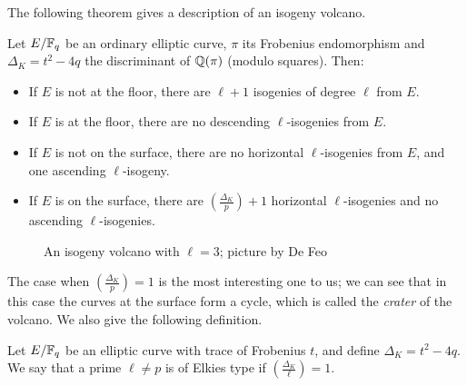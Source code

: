 The following theorem gives a description of an isogeny volcano.
\begin{theorem}
    Let $E/\mathbb{F}_q$ be an ordinary elliptic curve, $\pi$ its Frobenius endomorphism and $\Delta_K=t^2-4q$ the discriminant of $\mathbb{Q}(\pi)$ (modulo squares). Then:
    \begin{itemize}
        \item If $E$ is not at the floor, there are $\ell+1$ isogenies of degree $\ell$ from $E$.
        \item If $E$ is at the floor, there are no descending $\ell$-isogenies from $E$.
        \item If $E$ is not on the surface, there are no horizontal $\ell$-isogenies from $E$, and one ascending $\ell$-isogeny.
        \item If $E$ is on the surface, there are $\left( \frac{\Delta_K}{p} \right)+1$ horizontal $\ell$-isogenies and no ascending $\ell$-isogenies.
    \end{itemize}
\end{theorem}

\begin{figure}
    \centering
    \caption{An isogeny volcano with $\ell=3$; picture by De Feo}
    \label{picture_volcano}
\end{figure}

The case when $\left( \frac{\Delta_K}{p} \right)=1$ is the most interesting one to us; we can see that in this case the curves at the surface form a cycle, which is called the \emph{crater} of the volcano. We also give the following definition.
\begin{definition}
    Let $E/\mathbb{F}_q$ be an elliptic curve with trace of Frobenius $t$, and define $\Delta_K=t^2-4q$. We say that a prime $\ell\neq p$ is of Elkies type if $\left( \frac{\Delta_K}{\ell} \right)=1$.
\end{definition}


